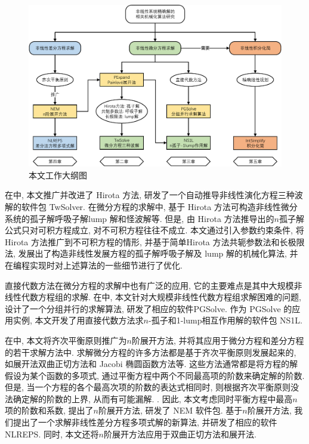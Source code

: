 \begin{figure}[htbp]
\includegraphics[width=\textwidth]{fig/outline.pdf}
\caption{本文工作大纲图}\label{outline}
\end{figure}

在中, 本文推广并改进了 Hirota 方法, 研发了一个自动推导非线性演化方程三种波解的软件包 TwSolver. 在微分方程的求解中, 基于 Hirota 方法可构造非线性微分系统的孤子解\D 呼吸子解\D lump 解和怪波解等. 但是, 由 Hirota 方法推导出的$n$孤子解公式只对可积方程成立, 对不可积方程往往不成立. 本文通过引入参数约束条件, 将 Hirota 方法推广到不可积方程的情形, 并基于简单Hirota 方法\D 共轭参数法和长极限法, 发展出了构造非线性发展方程的孤子解\D 呼吸子解及 lump 解的机械化算法, 并在编程实现时对上述算法的一些细节进行了优化. 

直接代数方法在微分方程的求解中也有广泛的应用, 它的主要难点是其中大规模非线性代数方程组的求解. 在中, 本文针对大规模非线性代数方程组求解困难的问题, 设计了一个分组并行的求解算法, 研发了相应的软件PGSolve. 作为 PGSolve 的应用实例, 本文开发了用直接代数方法求$n$-孤子和1-lump相互作用解的软件包 NS1L. 

在中, 本文将齐次平衡原则推广为$n$阶展开方法, 并将其应用于微分方程和差分方程的若干求解方法中. 求解微分方程的许多方法都是基于齐次平衡原则发展起来的, 如\Painleve{}展开法\D 双曲正切方法和 Jacobi 椭圆函数方法等. 这些方法通常都是将方程的解假设为某个函数的多项式, 通过平衡方程中两个不同最高项的阶数来确定解的阶数. 但是, 当一个方程的各个最高次项的阶数的表达式相同时, 则根据齐次平衡原则没法确定解的阶数的上界, 从而有可能漏解. . 因此, 本文考虑同时平衡方程中最高$n$项的阶数和系数, 提出了$n$阶展开方法, 研发了 NEM 软件包. 基于$n$阶展开方法, 我们提出了一个求解非线性差分方程多项式解的新算法, 并研发了相应的软件 NLREPS. 同时, 本文还将$n$阶展开方法应用于双曲正切方法和\Painleve{}展开法. 


